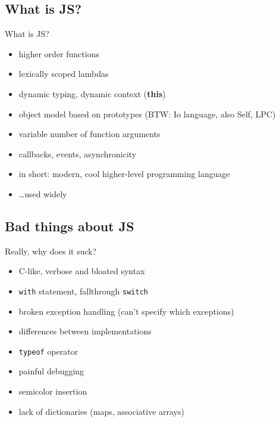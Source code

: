 \documentclass[xcolor=dvipsnames]{beamer}
\newcommand{\slide}[1]{\begin{frame}[fragile]{{#1}}}
\begin{document}
\subsection{What is JS?}
\slide{What is JS?}
    \begin{itemize}
        \item higher order functions
        \item lexically scoped lambdas
        \item dynamic typing, dynamic context (\textbf{this})
        \item object model based on prototypes (BTW: Io language, also Self, LPC)
        \item variable number of function arguments
        \item callbacks, events, asynchronicity

        \pause
        \vspace{0.5cm}

        \item in short: modern, cool higher-level programming language
        \item \ldots used widely
    \end{itemize}
\end{frame}


\subsection{Bad things about JS}

\slide{Really, why does it suck?}

    \begin{itemize}
        \item C-like, verbose and bloated syntax
        \item \verb+with+ statement, fallthrough \verb+switch+
        \item broken exception handling (can't specify which exceptions)
        \item differences between implementations
        \item \verb+typeof+ operator
        \item painful debugging
        \item semicolor insertion
        \item lack of dictionaries (maps, associative arrays)
    \end{itemize}
\end{frame}
\end{document}
